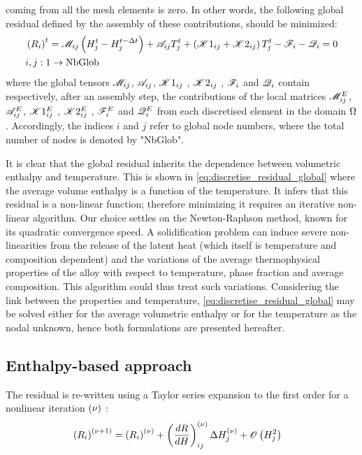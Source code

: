 coming from all the mesh elements is zero. In other words, the following global residual defined by 
the assembly of these contributions, should be minimized: 
\begin{align}
\begin{split}
\label{eq:discretise_residual_global}
& \left( R_i \right)^t = \mathscr{M}_{ij} \left( H_j^t - H_j^{t-\Delta t} \right) + \mathscr{A}_{ij} T_j^t + \left( \mathscr{K}1_{ij} + \mathscr{K}2_{ij} \right)T_j^t -\mathscr{F}_{i} - \mathscr{Q}_{i}=0 \\
& i,j:1 \rightarrow \text{NbGlob}
\end{split}
\end{align}
where the global tensors $\mathscr{M}_{ij}$, $\mathscr{A}_{ij}$, $\mathscr{K}1_{ij}$ , $\mathscr{K}2_{ij}$ , $\mathscr{F}_{i}$ and $\mathscr{Q}_{i}$ contain respectively, after an assembly step, 
the contributions of the local matrices $\mathscr{M}_{ij}^E$, $\mathscr{A}_{ij}^E$, $\mathscr{K}1_{ij}^E$ , $\mathscr{K}2_{ij}^E$ , $\mathscr{F}_{i}^E$ and $\mathscr{Q}_{i}^E$ from each discretised 
element in the domain $\Omega$. Accordingly, the indices $i$ and $j$ refer to global node numbers, where the total number of nodes is 
denoted by "NbGlob". 

It is clear that the global residual inherits the dependence between volumetric enthalpy and temperature. 
This is shown in \cref{eq:discretise_residual_global} where the average volume enthalpy is a function of the temperature. It infers that this residual 
is a non-linear function; therefore minimizing it requires an iterative non-linear algorithm. Our choice settles on the 
Newton-Raphson method, known for its quadratic convergence speed. A solidification problem can induce severe non-linearities 
from the release of the latent heat (which itself is temperature and composition dependent) and the variations of the average thermophysical 
properties of the alloy with respect to temperature, phase fraction and average composition. This algorithm could thus treat such variations. 
Considering the link between the properties and temperature, \cref{eq:discretise_residual_global} may be solved either for the average volumetric enthalpy 
or for the temperature as the nodal unknown, hence both formulations are presented hereafter.


\subsection{Enthalpy-based approach }

The residual is re-written using a Taylor series expansion to the first order for a nonlinear iteration ${\left( \nu \right)}$ :
\begin{align}
\label{eq:Hsolver_residual}
& \left( R_i \right)^{{\left( \nu+1 \right)}} = \left( R_i \right)^{{\left( \nu \right)}} + \left( \frac{dR}{dH} \right)^{{\left( \nu \right)}}_{ij} \Delta H_j^{{\left( \nu \right)}} + \mathscr{O}\left( H_j^2 \right)
\end{align}

